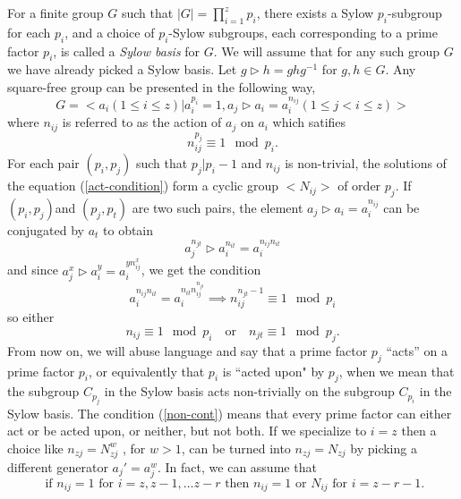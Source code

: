 \documentclass[11pt]{book}
\theoremstyle{Rem}
\theoremstyle{definition}
\numberwithin{equation}{section}
\newcommand\hit{\triangleright}
\newcommand\inv{^{-1}}
\begin{document}
For a finite group $G$ such that $|G| = \prod_{i=1}^z p_i$, there exists a Sylow $p_i$-subgroup for each $p_i$, and a choice of $p_i$-Sylow subgroups, each corresponding to a prime factor $p_i$, is called a \textit{Sylow basis} for $G$. We will assume that for any such group $G$ we have already picked a Sylow basis. Let $g\hit h = ghg\inv$ for $g, h \in G$. Any square-free group can be presented in the following way,  
\begin{equation}\label{presentation}
	G= <a_i (1\leq i\leq z)| a_i^{p_i} =1, a_j\hit a_i = a_i^{n_{ij}} (1\leq j<i\leq z)>
\end{equation}
where $n_{ij}$ is referred to as the action of $a_j$ on $a_i$ which satifies \begin{equation}\label{act-condition}
	n_{ij}^{p_j}\equiv 1 \mod p_i.
\end{equation} For each pair $(p_i, p_j)$ such that $p_j|p_i-1$ and $n_{ij}$ is non-trivial, the solutions of the equation (\ref{act-condition}) form a cyclic group $<N_{ij}>$ of order $p_j$.
If $(p_i, p_j) $and $(p_j, p_t)$ are two such pairs, the element $a_j\hit a_i = a_i^{n_{ij}}$ can be conjugated by $a_t$ to obtain \begin{equation*}
	a_j^{n_{jt}}\hit a_i^{n_{it}} = a_i^{n_{ij}n_{it}}
\end{equation*}
and since $a_j^x\hit a_i^y = a_i^{yn_{ij}^x}$, we get the condition \begin{equation*}
	a_i^{n_{ij}n_{it}} = a_i^{n_{it}n_{ij}^{n_{jt}}} \implies n_{ij}^{n_{jt} -1} \equiv 1 \mod p_i
\end{equation*}
so either \begin{equation}\label{non-cont}
	n_{ij} \equiv 1 \mod p_i \quad \text{or}\quad n_{jt} \equiv 1 \mod p_j.
\end{equation} From now on, we will abuse language and say that a prime factor $p_j$ ``acts'' on a prime factor $p_i$, or equivalently that $p_i$ is ``acted upon" by $p_j$, when we mean that the subgroup $C_{p_j}$ in the Sylow basis acts non-trivially on the subgroup $C_{p_i}$ in the Sylow basis. The condition (\ref{non-cont}) means that every prime factor can either act or be acted upon, or neither, but not both. If we specialize to $i = z$ then a choice like $n_{zj} =N_{zj}^w$ , for  $w>1$, can be turned into $n_{zj} =N_{zj}$ by picking a different generator $a_j'= a_j^w$. In fact, we can assume that \begin{equation}\label{possible}
	\text{ if $n_{ij} =1$ for $i= z, z-1,\dots z-r$ then $n_{ij}= 1$ or $N_{ij}$ for $i = z-r-1$.}
\end{equation} 
\end{document}

